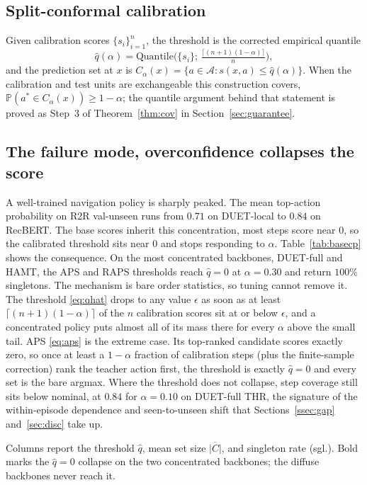 \subsection{Split-conformal calibration}
Given calibration scores $\{s_i\}_{i=1}^n$, the threshold is the corrected
empirical quantile
\begin{equation}
\hat q(\alpha) = \mathrm{Quantile}\Big(\{s_i\};\,
\tfrac{\lceil(n+1)(1-\alpha)\rceil}{n}\Big),
\label{eq:qhat}
\end{equation}
and the prediction set at $x$ is $C_\alpha(x) = \{a \in \mathcal{A} :
s(x,a) \leq \hat q(\alpha)\}$. When the calibration and test units are
exchangeable this construction covers, $\mathbb{P}(a^* \in C_\alpha(x)) \geq
1-\alpha$; the quantile argument behind that statement is proved as Step~3 of
Theorem~\ref{thm:cov} in Section~\ref{sec:guarantee}.

\subsection{The failure mode, overconfidence collapses the score}
\label{ssec:failure}
A well-trained navigation policy is sharply peaked. The mean top-action
probability on R2R val-unseen runs from $0.71$ on DUET-local to
$0.84$ on RecBERT. The base scores inherit this concentration, most steps
score near $0$, so the calibrated threshold sits near $0$ and stops
responding to $\alpha$. Table~\ref{tab:basecp} shows the consequence. On the
most concentrated backbones, DUET-full and HAMT, the APS and RAPS thresholds
reach $\hat q = 0$ at $\alpha = 0.30$ and return $100\%$ singletons. The
mechanism is bare order statistics, so tuning cannot remove it. The threshold
\eqref{eq:qhat} drops to any value $\epsilon$ as soon as at least
$\lceil(n+1)(1-\alpha)\rceil$ of the $n$ calibration scores sit at or below
$\epsilon$, and a concentrated policy puts almost all of its mass there for
every $\alpha$ above the small tail. APS \eqref{eq:aps} is the extreme
case. Its top-ranked candidate scores exactly zero, so once at least a $1-\alpha$ fraction of
calibration steps (plus the finite-sample correction) rank the teacher action
first, the threshold is exactly $\hat q = 0$ and every set is the bare
argmax. Where the threshold does not collapse, step coverage still sits below
nominal, at $0.84$ for $\alpha = 0.10$ on DUET-full THR, the signature of the
within-episode dependence and seen-to-unseen shift that
Sections~\ref{ssec:gap} and~\ref{sec:disc} take up.


Columns report the threshold $\hat q$, mean set size $\overline{|C|}$, and
singleton rate (sgl.). Bold marks the $\hat q = 0$ collapse on the two
concentrated backbones; the diffuse backbones never reach it.
